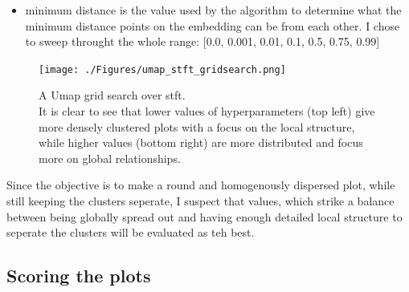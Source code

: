 \documentclass[11pt]{article}
\begin{document}
\begin{itemize}
\begin{itemize}
\item minimum distance is the value used by the algorithm to determine what the minimum distance points on the embedding can be from each other. I chose to sweep throught the whole range: [0.0, 0.001, 0.01, 0.1, 0.5, 0.75, 0.99]
\end{itemize}
\end{itemize}

\begin{figure}
\texttt{[image: ./Figures/umap\_stft\_gridsearch.png]}
\caption{A Umap grid search over stft.\\ It is clear to see that lower values of hyperparameters (top left) give more densely clustered plots with a focus on the local structure, while higher values (bottom right) are more distributed and focus more on global relationships.}
\end{figure}




Since the objective is to make a round and homogenously dispersed plot, while still keeping the clusters seperate, I suspect that values, which strike a balance between being globally spread out and having enough detailed local structure to seperate the clusters will be evaluated as teh best.

\subsection{Scoring the plots}
\label{sec:org007743d}
\end{document}
